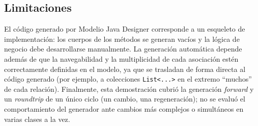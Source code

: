 \documentclass[11pt,a4paper]{article}
\begin{document}
\subsection{Limitaciones}
El código generado por Modelio Java Designer corresponde a un esqueleto de
implementación: los cuerpos de los métodos se generan vacíos y la lógica de
negocio debe desarrollarse manualmente. La generación automática depende
además de que la navegabilidad y la multiplicidad de cada asociación estén
correctamente definidas en el modelo, ya que se trasladan de forma directa al
código generado (por ejemplo, a colecciones \texttt{List<...>} en el extremo
``muchos'' de cada relación). Finalmente, esta demostración cubrió la
generación \textit{forward} y un \textit{roundtrip} de un único ciclo (un
cambio, una regeneración); no se evaluó el comportamiento del generador ante
cambios más complejos o simultáneos en varias clases a la vez.
\newpage


\end{document}
